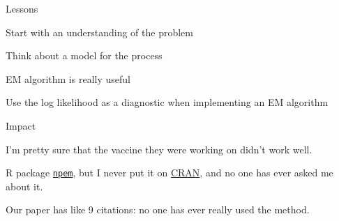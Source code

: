 \documentclass[aspectratio=169,12pt,t]{beamer}
\begin{document}
\begin{frame}{Lessons}

  \bbi
\item Start with an understanding of the problem
\item Think about a model for the process
\item EM algorithm is really useful
\item Use the log likelihood as a diagnostic when implementing an EM
  algorithm
  \ei
\end{frame}



\begin{frame}{Impact}

  \bbi
\item I'm pretty sure that the vaccine they were working on didn't
  work well.
\item R package \href{https://github.com/kbroman/npem}{\tt npem}, but
  I never put it on \href{https://cran.r-project.org}{CRAN}, and no
  one has ever asked me about it.
\item Our paper has like 9 citations: no one has ever really used the
  method.
  \ei

\end{frame}
\end{document}

